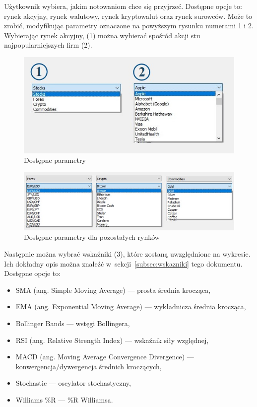 \documentclass[12pt]{article}
\begin{document}
    Użytkownik wybiera, jakim notowaniom chce się przyjrzeć.
	Dostępne opcje to: rynek akcyjny, rynek walutowy, rynek kryptowalut oraz rynek surowców.
	Może to zrobić, modyfikując parametry oznaczone na powyższym rysunku numerami 1 i 2.
	Wybierając rynek akcyjny, (1) można wybierać spośród akcji stu najpopularniejszych firm (2).

    \begin{figure}[H]
        \centering
        \includegraphics[scale=0.7]{pics/opcje_12}
        \caption{Dostępne parametry}\label{fig:figure3}
	\end{figure}

    \begin{figure}[H]
        \centering
        \includegraphics[scale=0.7]{pics/forex_crypto_commodities}
        \caption{Dostępne parametry dla pozostałych rynków}\label{fig:figure4}
	\end{figure}

    Następnie można wybrać wskaźniki (3), które zostaną uwzględnione na wykresie.
	Ich dokładny opis można znaleźć w~sekcji~\ref{subsec:wskazniki} tego dokumentu.
	Dostępne opcje to:

    \begin{itemize}
        \item SMA (ang. Simple Moving Average) — prosta średnia krocząca,
        \item EMA (ang. Exponential Moving Average) — wykładnicza średnia krocząca,
        \item Bollinger Bands — wstęgi Bollingera,
        \item RSI (ang. Relative Strength Index) — wskaźnik siły względnej,
        \item MACD (ang. Moving Average Convergence Divergence) — konwergencja/dywergencja średnich kroczących,
        \item Stochastic — oscylator stochastyczny,
        \item Williams \%R — \%R Williamsa.
    \end{itemize}
\end{document}

